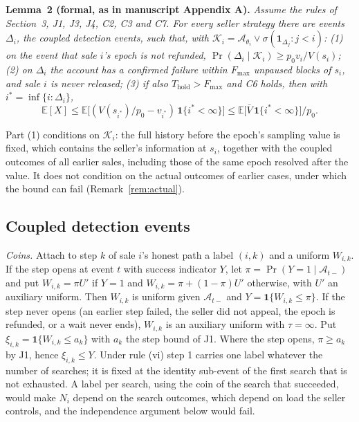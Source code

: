 \documentclass[10pt,a4paper]{article}
\newcommand{\Thold}{T_{\mathrm{hold}}}
\newcommand{\Fmax}{F_{\max}}
\newcommand{\E}{\mathbb{E}}
\newcommand{\ist}{i^{*}}
\newcommand{\cA}{\mathcal{A}}
\newcommand{\cK}{\mathcal{K}}
\newcommand{\one}{\mathbf{1}}
\theoremstyle{plain}
\theoremstyle{remark}
\begin{document}
\begin{trivlist}\item \textbf{Lemma~2 (formal, as in manuscript Appendix A).} \itshape Assume the rules of Section~3, J1, J3, J4, C2, C3 and C7. For every seller strategy there are events $\Delta_i$, the coupled detection events, such that, with $\cK_i=\cA_{\theta_i}\vee\sigma(\one_{\Delta_j}:j<i)$:
(1) on the event that sale $i$'s epoch is not refunded, $\Pr(\Delta_i\mid\cK_i)\ge p_0v_i/V(s_i)$;
(2) on $\Delta_i$ the account has a confirmed failure within $\Fmax$ unpaused blocks of $s_i$, and sale $i$ is never released;
(3) if also $\Thold>\Fmax$ and C6 holds, then with $\ist=\inf\{i:\Delta_i\}$,
\[
\E[X]\le\E\big[(V(s_{\ist})/p_0-v_{\ist})\,\one\{\ist<\infty\}\big]\le\E\big[\bar V\,\one\{\ist<\infty\}\big]/p_0 .
\]
\end{trivlist}

Part (1) conditions on $\cK_i$: the full history before the epoch's sampling value is fixed, which contains the seller's information at $s_i$, together with the coupled outcomes of all earlier sales, including those of the same epoch resolved after the value. It does not condition on the actual outcomes of earlier cases, under which the bound can fail (Remark~\ref{rem:actual}).

\subsection{Coupled detection events}
\label{sec:coupling}

\emph{Coins.} Attach to step $k$ of sale $i$'s honest path a label $(i,k)$ and a uniform $W_{i,k}$. If the step opens at event $t$ with success indicator $Y$, let $\pi=\Pr(Y=1\mid\cA_{t-})$ and put $W_{i,k}=\pi U'$ if $Y=1$ and $W_{i,k}=\pi+(1-\pi)U'$ otherwise, with $U'$ an auxiliary uniform. Then $W_{i,k}$ is uniform given $\cA_{t-}$ and $Y=\one\{W_{i,k}\le\pi\}$. If the step never opens (an earlier step failed, the seller did not appeal, the epoch is refunded, or a wait never ends), $W_{i,k}$ is an auxiliary uniform with $\tau=\infty$. Put $\xi_{i,k}=\one\{W_{i,k}\le a_k\}$ with $a_k$ the step bound of J1. Where the step opens, $\pi\ge a_k$ by J1, hence $\xi_{i,k}\le Y$. Under rule (vi) step 1 carries one label whatever the number of searches; it is fixed at the identity sub-event of the first search that is not exhausted. A label per search, using the coin of the search that succeeded, would make $N_i$ depend on the search outcomes, which depend on load the seller controls, and the independence argument below would fail.
\end{document}
